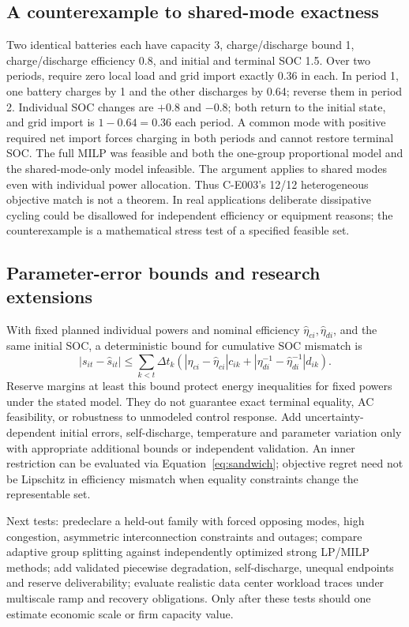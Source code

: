\documentclass[11pt,letterpaper]{article}
\begin{document}
\subsection{A counterexample to shared-mode exactness}
Two identical batteries each have capacity 3, charge/discharge bound 1, charge/discharge efficiency 0.8, and initial and terminal SOC 1.5. Over two periods, require zero local load and grid import exactly 0.36 in each. In period 1, one battery charges by 1 and the other discharges by 0.64; reverse them in period 2. Individual SOC changes are $+0.8$ and $-0.8$; both return to the initial state, and grid import is $1-0.64=0.36$ each period. A common mode with positive required net import forces charging in both periods and cannot restore terminal SOC. The full MILP was feasible and both the one-group proportional model and the shared-mode-only model infeasible. The argument applies to shared modes even with individual power allocation. Thus C-E003's 12/12 heterogeneous objective match is not a theorem. In real applications deliberate dissipative cycling could be disallowed for independent efficiency or equipment reasons; the counterexample is a mathematical stress test of a specified feasible set.

\subsection{Parameter-error bounds and research extensions}
With fixed planned individual powers and nominal efficiency $\widehat\eta_{ci},\widehat\eta_{di}$, and the same initial SOC, a deterministic bound for cumulative SOC mismatch is
\[
|s_{it}-\widehat s_{it}|
\le\sum_{k<t}\Delta t_k\left(
|\eta_{ci}-\widehat\eta_{ci}|c_{ik}+
|\eta_{di}^{-1}-\widehat\eta_{di}^{-1}|d_{ik}\right).
\]
Reserve margins at least this bound protect energy inequalities for fixed powers under the stated model. They do not guarantee exact terminal equality, AC feasibility, or robustness to unmodeled control response. Add uncertainty-dependent initial errors, self-discharge, temperature and parameter variation only with appropriate additional bounds or independent validation. An inner restriction can be evaluated via Equation~\ref{eq:sandwich}; objective regret need not be Lipschitz in efficiency mismatch when equality constraints change the representable set.

Next tests: predeclare a held-out family with forced opposing modes, high congestion, asymmetric interconnection constraints and outages; compare adaptive group splitting against independently optimized strong LP/MILP methods; add validated piecewise degradation, self-discharge, unequal endpoints and reserve deliverability; evaluate realistic data center workload traces under multiscale ramp and recovery obligations. Only after these tests should one estimate economic scale or firm capacity value.
\end{document}
